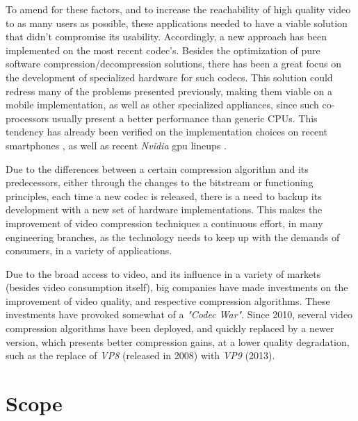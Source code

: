 To amend for these factors, and to increase the reachability of high quality video to as many users as possible, these applications needed to have a viable solution that didn't compromise its usability. Accordingly, a new approach has been implemented on the most recent codec's. Besides the optimization of pure software compression/decompression solutions, there has been a great focus on the development of specialized hardware for such codecs. This solution could redress many of the problems presented previously, making them viable on a mobile implementation, as well as other specialized appliances, since such co-processors usually present a better performance than generic CPUs. This tendency has already been verified on the implementation choices on recent smartphones \cite[p.~14]{scientiamobileMobileOverviewReport}, as well as recent \textit{Nvidia} \gls{gpu} lineups \cite{VideoEncodeDecode2016}.

Due to the differences between a certain compression algorithm and its predecessors, either through the changes to the bitstream or functioning principles, each time a new codec is released, there is a need to backup its development with a new set of hardware implementations. This makes the improvement of video compression techniques a continuous effort, in many engineering branches, as the technology needs to keep up with the demands of consumers, in a variety of applications.

Due to the broad access to video, and its influence in a variety of markets (besides video consumption itself), big companies have made investments on the improvement of video quality, and respective compression algorithms. These investments have provoked somewhat of a \emph{"Codec War"}. Since 2010, several video compression algorithms have been deployed, and quickly replaced by a newer version, which presents better compression gains, at a lower quality degradation, such as the replace of \textit{VP8} (released in 2008) with \textit{VP9} (2013).

\section{Scope}


